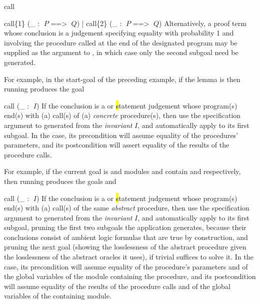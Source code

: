 \begin{tactic}{call}
\begin{tsyntax}{call\{1\} (_ : $\;P$ ==> $\;Q$) | call\{2\} (_ : $\;P$ ==> $\;Q$)}
  \bigskip Alternatively, a proof term whose conclusion is a \phl
  judgement specifying equality with probability 1 and involving the
  procedure called at the end of the designated program may be
  supplied as the argument to , in which case only the second
  subgoal need be generated.

  \medskip
  For example, in the start-goal of the preceding example,
  if the lemma  is
  then running
   produces the
  goal 
  \end{tsyntax}

  \begin{tsyntax}{call (_ : $\;I$)}
    If the conclusion is a \prhl or \hl statement judgement whose
    program(s) end(s) with (a) call(s) of (a) \emph{concrete}
    procedure(s), then use the specification argument to 
    generated from the \emph{invariant} $I$, and automatically apply
     to its first subgoal.  In the \prhl case, its
    precondition will assume equality of the procedures' parameters,
    and its postcondition will assert equality of the results of the
    procedure calls.

    \medskip
    For example, if the current goal is
    and modules  and  contain
     and
    respectively, then
    running 
    produces the goals
     and
  \end{tsyntax}

  \begin{tsyntax}{call (_ : $\;I$)}
    If the conclusion is a \prhl or \hl statement judgement whose
    program(s) end(s) with (a) call(s) of the same \emph{abstract}
    procedure, then use the specification argument to 
    generated from the \emph{invariant} $I$, and automatically apply
     to its first subgoal, pruning the first two
    subgoals the application generates, because their conclusions
    consist of ambient logic formulas that are true by construction,
    and pruning the next goal (showing the losslessness of the abstract
    procedure given the losslessness of the abstract oracles it uses), if
    trivial suffices to solve it.
    In the \prhl case, its precondition will assume equality of the
    procedure's parameters and of the global variables of the module
    containing the procedure, and its postcondition will assume
    equality of the results of the procedure calls and of the global
    variables of the containing module.


\end{tsyntax}
\end{tactic}
